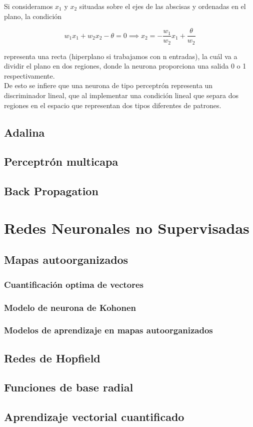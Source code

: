 Si consideramos $x_1$ y $x_2$ situadas sobre el ejes de las abscisas y
ordenadas en el plano, la condición

\begin{equation}
  w_1x_1 + w_2x_2 - \theta = 0 \implies x_2 = -\frac{w_1}{w_2}x_1 + \frac{\theta}{w_2}
\end{equation}

representa una recta (hiperplano si trabajamos con n entradas), la
cuál va a dividir el plano en dos regiones, donde la neurona
proporciona una salida 0 o 1 respectivamente.\\

De esto se infiere que una neurona de tipo perceptrón representa un
discriminador lineal, que al implementar una condición lineal que
separa dos regiones en el espacio que representan dos tipos diferentes
de patrones.

\subsection{Adalina}


\subsection{Perceptrón multicapa}


\subsection{Back Propagation}


\section{Redes Neuronales no Supervisadas}


\subsection{Mapas autoorganizados}


\subsubsection{Cuantificación optima de vectores}



\subsubsection{Modelo de neurona de Kohonen}


\subsubsection{Modelos de aprendizaje en mapas autoorganizados}



\subsection{Redes de Hopfield}



\subsection{Funciones de base radial}



\subsection{Aprendizaje vectorial cuantificado}
